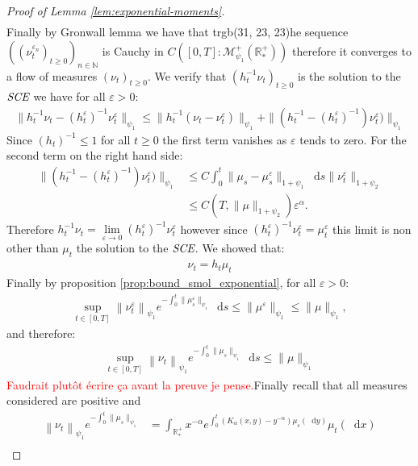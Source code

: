 \documentclass[11pt,a4paper]{article}
\newcommand{\RRP}{\mathbb{R}^+_*}
\newcommand{\MC}{\mathcal{M}}
\newcommand{\SCE}{\emph{SCE}}
\newcommand{\red}[1]{\textcolor{red}{#1}}
\newcommand{\Proc}[1]{\left(#1\right)_{t\geq 0}}
\newcommand{\Seq}[1]{\left(#1\right)_{n\in \mathbb{N}}}
\newcommand{\dd}{\mathop{}\!\mathrm{d}}
\begin{document}
\begin{proof}[Proof of Lemma \ref{lem:exponential-moments}]
\begin{align*}
    \end{align*}
    Finally by Gronwall lemma we have that trgb(31, 23, 23)he sequence $\Seq{\Proc{\nu_t^{\varepsilon_n}}}$ is Cauchy in $C\left([0,T]:\MC^+_{\psi_1}(\RRP)\right)$ therefore it converges to a flow of measures $\Proc{\nu_t}$. We verify that $\Proc{h_t^{-1}\nu_t}$ is the solution to the $\SCE$ we have for all $\varepsilon > 0$:
    \begin{align*}
        \|h_t^{-1}\nu_t - \left(h^\varepsilon_t\right)^{-1}\nu^\varepsilon_t\|_{\psi_1} \leq \|h_t^{-1}(\nu_t -\nu^\varepsilon_t) \|_{\psi_1} + \|(h_t^{-1} - \left(h^\varepsilon_t\right)^{-1})\nu^\varepsilon_t) \|_{\psi_1}
    \end{align*}
    Since $(h_t)^{-1} \leq 1$ for all $t \geq 0$ the first term vanishes as $\varepsilon$ tends to zero. For the second term on the right hand side:
    \begin{align*}
        \|(h_t^{-1} - \left(h^\varepsilon_t\right)^{-1})\nu^\varepsilon_t) \|_{\psi_1} &\leq C \int_0^t\|\mu_s - \mu_s^\varepsilon\|_{1 + \psi_1}\dd s\|\nu^\varepsilon_t \|_{1 + \psi_2} \\
        &\leq C(T,\|\mu\|_{1 + \psi_2})\varepsilon^{\alpha}.
    \end{align*}
    Therefore $h_t^{-1}\nu_t = \lim\limits_{\varepsilon \to 0} \left(h^{\varepsilon}_t\right)^{-1}\nu^\varepsilon_t $ however since $\left(h^{\varepsilon}_t\right)^{-1}\nu^\varepsilon_t = \mu^\varepsilon_t$ this limit is non other than $\mu_t$ the solution to the $\SCE$. We showed that:
    \begin{align*}
        \nu_t = h_t\mu_t 
    \end{align*}
    Finally by proposition \ref{prop:bound_smol_exponential}, for all $\varepsilon> 0$:
    \begin{align*}
        \sup\limits_{t \in [0,T]}\left\|\nu^\varepsilon_t\right\|_{\psi_1} e^{-\int_0^t \|\mu^\varepsilon_s\|_{\psi_1}}\dd s\leq \|\mu^\varepsilon\|_{\psi_1} \leq  \|\mu\|_{\psi_1},
    \end{align*}
    and therefore:
    \begin{align*}
        \sup\limits_{t \in [0,T]}\left\|\nu_t\right\|_{\psi_1} e^{-\int_0^t \|\mu_s\|_{\psi_1}}\dd s\leq \|\mu\|_{\psi_1}
    \end{align*}
    \red{ Faudrait plutôt écrire ça avant la preuve je pense.}Finally recall that all measures considered are positive and 
    \begin{align*}
        \left\|\nu_t\right\|_{\psi_1} e^{-\int_0^t \|\mu_s\|_{\psi_1}} &= \int_{\RRP} x^{-\alpha}e^{\int_0^t (K_\alpha(x,y) -y^{-\alpha})\mu_s(\dd y)} \mu_t(\dd x) \\

\end{align*}
\end{proof}
\end{document}
